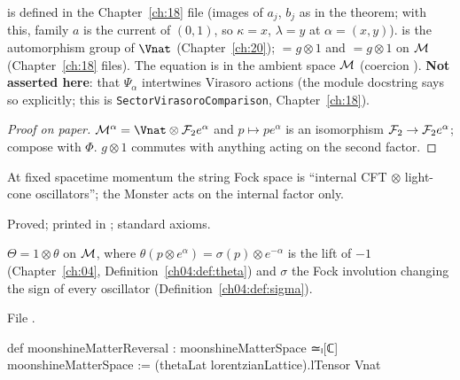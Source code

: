 \begin{dictionary}
 is defined in the Chapter~\ref{ch:18}
file  (images of $a_j$, $b_j$ as in the theorem; with this, family
$a$ is the current of $(0,1)$, so $\kappa=x$, $\lambda=y$ at $\alpha=(x,y)$).   is the automorphism group of $\Vnat$
(Chapter~\ref{ch:20});  $=g\otimes1$ and  $=g\otimes1$ on $\mathcal{M}$
(Chapter~\ref{ch:18} files).  The equation is in the ambient space $\mathcal{M}$ (coercion ).
\textbf{Not asserted here}: that $\Psi_\alpha$ intertwines Virasoro actions (the module docstring says so explicitly; this is
\texttt{SectorVirasoroComparison}, Chapter~\ref{ch:18}).
\end{dictionary}

\begin{proof}[Proof on paper]
$\chseventeenM^\alpha=\Vnat\otimes\chseventeenF_2e^\alpha$ and $p\mapsto pe^\alpha$ is an isomorphism $\mathcal{F}_2\to\mathcal{F}_2e^\alpha$; compose with $\Phi$.
$g\otimes1$ commutes with anything acting on the second factor.
\end{proof}

\begin{physics}
At fixed spacetime momentum the string Fock space is ``internal CFT $\otimes$ light-cone oscillators''; the Monster acts on
the internal factor only.
\end{physics}

\begin{status}
Proved; printed in ; standard axioms.
\end{status}

\begin{definition}\label{ch17:def:reversal}
$\Theta=1\otimes\theta$ on $\mathcal{M}$, where $\theta(p\otimes e^\alpha)=\sigma(p)\otimes e^{-\alpha}$ is the lift of $-1$ (Chapter~\ref{ch:04},
Definition~\ref{ch04:def:theta}) and $\sigma$ the Fock involution changing the sign of every oscillator
(Definition~\ref{ch04:def:sigma}).
\end{definition}

\noindent File .
\begin{leancode}
def moonshineMatterReversal : moonshineMatterSpace ≃ₗ[ℂ] moonshineMatterSpace :=
  (thetaLat lorentzianLattice).lTensor Vnat
\end{leancode}

